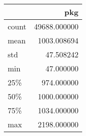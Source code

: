 \begin{tabular}{lr}
\toprule
{} &           pkg \\
\midrule
count &  49688.000000 \\
mean  &   1003.008694 \\
std   &     47.508242 \\
min   &     47.000000 \\
25\%   &    974.000000 \\
50\%   &   1000.000000 \\
75\%   &   1034.000000 \\
max   &   2198.000000 \\
\bottomrule
\end{tabular}
